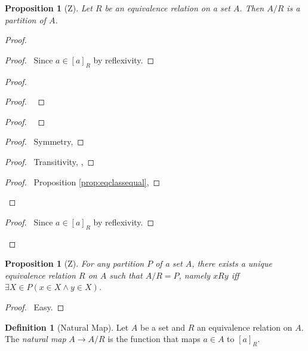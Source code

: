 \documentclass{book}
\let\qed\relax
\newtheorem{prop}[ax]{Proposition}
\theoremstyle{definition}
\newtheorem{df}[ax]{Definition}
\begin{document}
\begin{prop}[Z]
Let $R$ be an equivalence relation on a set $A$. Then $A/R$ is a partition of $A$.
\end{prop}

\begin{proof}
\pf
{}
\begin{proof}
	\pf\ Since $a \in [a]_R$ by reflexivity.
\end{proof}
\begin{proof}
	\begin{proof}
		\pf\ 
	\end{proof}
	\begin{proof}
		\pf\ 
	\end{proof}
	\begin{proof}
		\pf\ Symmetry, 
	\end{proof}
	\begin{proof}
		\pf\ Transitivity, , 
	\end{proof}
	\begin{proof}
		\pf\ Proposition \ref{prop:eqclassequal}, 
	\end{proof}
\end{proof}
\begin{proof}
	\pf\ Since $a \in [a]_R$ by reflexivity.
\end{proof}
\qed
\end{proof}

\begin{prop}[Z]
For any partition $P$ of a set $A$, there exists a unique equivalence relation $R$ on $A$ such that $A/R = P$, namely $xRy$ iff $\exists X \in P(x \in X \wedge y \in X)$.
\end{prop}

\begin{proof}
\pf\ Easy. \qed
\end{proof}

\begin{df}[Natural Map]
Let $A$ be a set and $R$ an equivalence relation on $A$. The \emph{natural map} $A \rightarrow A / R$ is the function that maps $a \in A$ to $[a]_R$.
\end{df}
\end{document}

